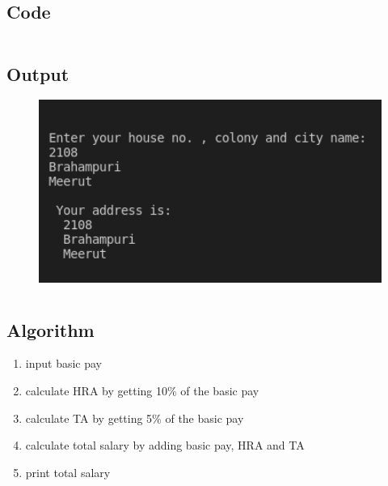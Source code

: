 \documentclass[12pt]{article}
\begin{document}
\subsection{Code}
\inputminted{c}{q7.c}
\subsection{Output}
\begin{figure}[h]
    \centering
    \includegraphics[width=1.0\textwidth]{7.png}
\end{figure}
\newpage
\section{}
\subsection{Algorithm}
\begin{enumerate}
    \item input basic pay
    \item calculate HRA by getting 10\% of the basic pay
    \item calculate TA by getting 5\% of the basic pay
    \item calculate total salary by adding basic pay, HRA and TA
    \item print total salary
\end{enumerate}
\end{document}
